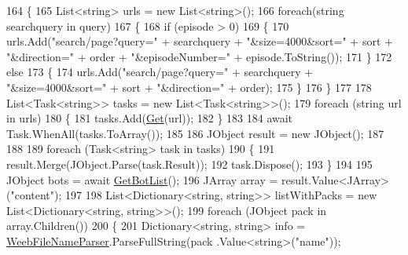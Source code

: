 \begin{DoxyCode}
164         \{
165             List<string> urls = \textcolor{keyword}{new} List<string>();
166             \textcolor{keywordflow}{foreach}(\textcolor{keywordtype}{string} searchquery \textcolor{keywordflow}{in} query)
167             \{
168                 \textcolor{keywordflow}{if} (episode > 0)
169                 \{
170                     urls.Add(\textcolor{stringliteral}{"search/page?query="} + searchquery + \textcolor{stringliteral}{"&size=4000&sort="} + sort + \textcolor{stringliteral}{"&direction="}
       + order + \textcolor{stringliteral}{"&episodeNumber="} + episode.ToString());
171                 \}
172                 \textcolor{keywordflow}{else}
173                 \{
174                     urls.Add(\textcolor{stringliteral}{"search/page?query="} + searchquery + \textcolor{stringliteral}{"&size=4000&sort="} + sort + \textcolor{stringliteral}{"&direction="}
       + order);
175                 \}
176             \}
177 
178             List<Task<string>> tasks = \textcolor{keyword}{new} List<Task<string>>();
179             \textcolor{keywordflow}{foreach} (\textcolor{keywordtype}{string} url \textcolor{keywordflow}{in} urls)
180             \{
181                 tasks.Add(\mbox{\hyperlink{class_little_weeb_library_1_1_handlers_1_1_nibl_handler_a2989b180582fadd05111d010c0700411}{Get}}(url));
182             \}
183 
184             await Task.WhenAll(tasks.ToArray());
185 
186             JObject result = \textcolor{keyword}{new} JObject();
187 
188           
189             \textcolor{keywordflow}{foreach} (Task<string> task \textcolor{keywordflow}{in} tasks)
190             \{
191                 result.Merge(JObject.Parse(task.Result));
192                 task.Dispose();
193             \}
194 
195             JObject bots = await \mbox{\hyperlink{class_little_weeb_library_1_1_handlers_1_1_nibl_handler_aac05976a2e1a688dd187ccca513ab3cc}{GetBotList}}();
196             JArray array = result.Value<JArray>(\textcolor{stringliteral}{"content"});
197 
198             List<Dictionary<string, string>> listWithPacks = \textcolor{keyword}{new} List<Dictionary<string, string>>();
199             \textcolor{keywordflow}{foreach} (JObject pack \textcolor{keywordflow}{in} array.Children())
200             \{
201                 Dictionary<string, string> info = \mbox{\hyperlink{class_little_weeb_library_1_1_handlers_1_1_nibl_handler_a0aae159f51f737bbb89946b8fe8c8743}{WeebFileNameParser}}.ParseFullString(pack
      .Value<\textcolor{keywordtype}{string}>(\textcolor{stringliteral}{"name"}));

\end{DoxyCode}
